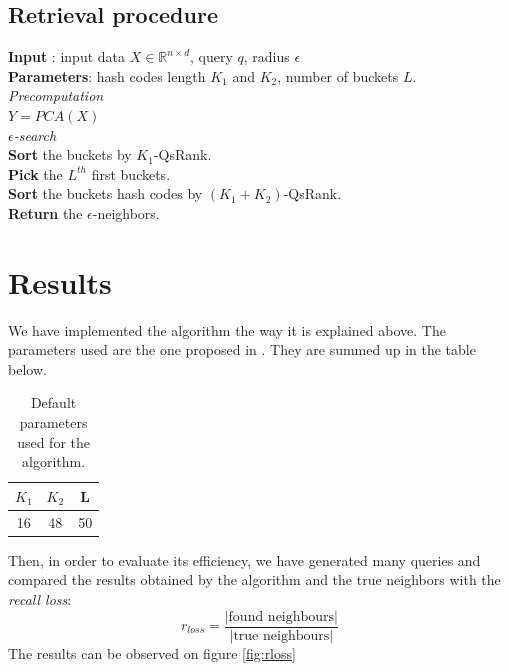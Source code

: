 \documentclass{article}
\newcommand{\RR}{\mathbb{R}}
\begin{document}
\subsection{Retrieval procedure}

\begin{algorithm}[H]

\textbf{Input} : input data $X \in \RR^{n \times d}$, query $q$, radius $\epsilon$\\
\textbf{Parameters}: hash codes length $K_1$ and $K_2$, number of buckets $L$.\\
\textit{Precomputation}\\
$Y = PCA(X)$\\
\textit{$\epsilon$-search}\\
\textbf{Sort} the buckets by $K_1$-QsRank.\\
\textbf{Pick} the $L^{th}$ first buckets.\\
\textbf{Sort} the buckets hash codes by $(K_1+K_2)$-QsRank.\\
\textbf{Return} the $\epsilon$-neighbors.
\end{algorithm}

\newpage

\section{Results}

We have implemented the algorithm the way it is explained above. The parameters used are the one proposed in \citep{QSRank}. They are summed up in the table below.
\begin{table}[htbp]
\begin{center}
  \begin{tabular}{|c|c|c|}
		\hline
		$K_1$ & $K_2$ & L \\
		\hline
		16 & 48 & 50\\
		\hline
\end{tabular}
\caption{Default parameters used for the algorithm.}
\end{center}
\label{tab:params}
\end{table}

Then, in order to evaluate its efficiency, we have generated many queries and compared the results obtained by the algorithm and the true neighbors with the \textit{recall loss}:
\[
	r_{loss} = \frac{|\text{found neighbours}|}{|\text{true neighbours}|}
\]
The results can be observed on figure \ref{fig:rloss}
\end{document}
